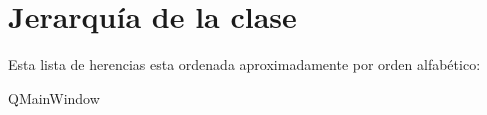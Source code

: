 \section{Jerarquía de la clase}
Esta lista de herencias esta ordenada aproximadamente por orden alfabético\+:\begin{DoxyCompactList}
\item {}
\item {}
\item Q\+Main\+Window\begin{DoxyCompactList}
\item {}
\end{DoxyCompactList}
\end{DoxyCompactList}
